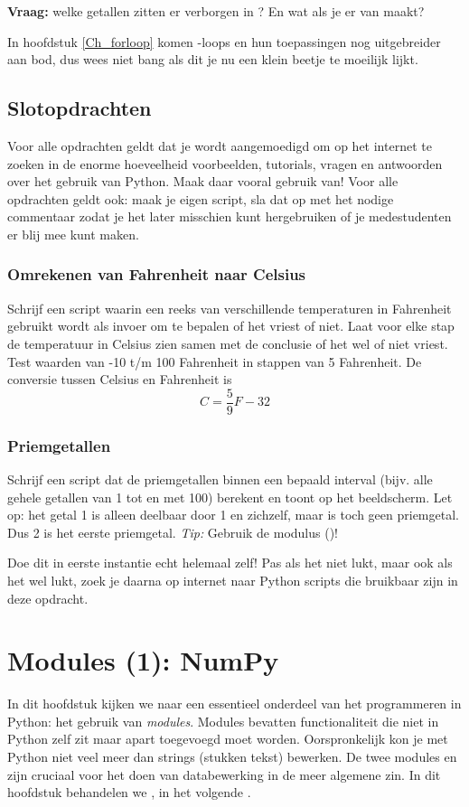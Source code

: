 \documentclass[a4paper,11pt, fleqn]{article}
\newcommand{\ditwc}{Naam van het huidige werkcollege}
\begin{document}
\textbf{Vraag:} welke getallen zitten er verborgen in ? En wat als je er  van maakt?

In hoofdstuk \ref{Ch_forloop} komen -loops en hun toepassingen nog uitgebreider aan bod, dus wees niet bang als dit je nu een klein beetje te moeilijk lijkt.

\subsection{Slotopdrachten}
Voor alle opdrachten geldt dat je wordt aangemoedigd om op het internet te zoeken in de enorme hoeveelheid voorbeelden, tutorials, vragen en antwoorden over het gebruik van Python. Maak daar vooral gebruik van! Voor alle opdrachten geldt ook: maak je eigen script, sla dat op met het nodige commentaar zodat je het later misschien kunt hergebruiken of je medestudenten er blij mee kunt maken.

\subsubsection{Omrekenen van Fahrenheit naar Celsius}
Schrijf een script waarin een reeks van verschillende temperaturen in Fahrenheit gebruikt wordt als invoer om te bepalen of het vriest of niet. Laat voor elke stap de temperatuur in Celsius zien samen met de conclusie of het wel of niet vriest. Test waarden van -10 t/m 100 Fahrenheit in stappen van 5 Fahrenheit. De conversie tussen Celsius en Fahrenheit is
\begin{equation}
C = \frac{5}{9}F - 32
\end{equation}

\subsubsection{Priemgetallen}
Schrijf een script dat de priemgetallen binnen een bepaald interval (bijv. alle gehele getallen van 1 tot en met 100) berekent en toont op het beeldscherm. Let op: het getal 1 is alleen deelbaar door 1 en zichzelf, maar is toch geen priemgetal. Dus 2 is het eerste priemgetal. \textit{Tip:} Gebruik de modulus (\pythoninline{\%})!

Doe dit in eerste instantie echt helemaal zelf! Pas als het niet lukt, maar ook als het wel lukt, zoek je daarna op internet naar Python scripts die bruikbaar zijn in deze opdracht. 

\clearpage
\renewcommand{\ditwc}{Modules (1): NumPy}
\section[Modules (1): NumPy]{\ditwc}
In dit hoofdstuk kijken we naar een essentieel onderdeel van het programmeren in Python: het gebruik van {\it modules}. Modules bevatten functionaliteit die niet in Python zelf zit maar apart toegevoegd moet worden. Oorspronkelijk kon je met Python niet veel meer dan strings (stukken tekst) bewerken. De twee modules  en  zijn cruciaal voor het doen van databewerking in de meer algemene zin. In dit hoofdstuk behandelen we , in het volgende .
\end{document}
